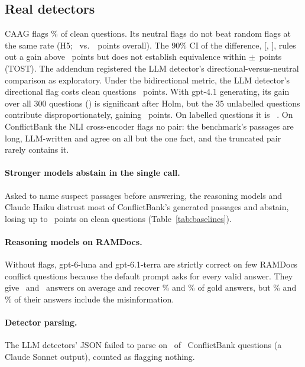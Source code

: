 \subsection{Real detectors}
CAAG flags \cleanFprCaag\% of clean questions. Its neutral flags do not beat random flags at the same rate (H5;
\dCaagFlagAll\ vs.\ \dRandFlagAll\ points overall). The 90\% CI of the difference, [\tostLo, \tostHi], rules out a
gain above \tostHi\ points but does not establish equivalence within $\pm$\tostMargin\ points (TOST). The
addendum registered the LLM detector's directional-versus-neutral comparison as exploratory.
Under the bidirectional metric, the LLM detector's directional flag costs clean questions \arLlmDirClean\ points. With
gpt-4.1 generating, its gain over all 300 questions (\gptLlmDirAll) is significant after Holm, but the 35
unlabelled questions contribute disproportionately, gaining \agptexclLlmDir\ points. On labelled
questions it is \gptlabLlmDir\ \gptlabLlmDirCI. On ConflictBank the NLI cross-encoder flags no pair:
the benchmark's passages are long, LLM-written and agree on all but the one fact, and the truncated pair rarely
contains it.

\paragraph{Stronger models abstain in the single call.} Asked to name suspect passages before answering, the reasoning
models and Claude Haiku distrust most of ConflictBank's generated passages and abstain, losing up to
\azSgTerraSelfIdentifyClean\ points on clean questions (Table~\ref{tab:baselines}).

\paragraph{Reasoning models on RAMDocs.} Without flags, gpt-6-luna and gpt-6.1-terra are
strictly correct on few RAMDocs conflict questions because the default prompt asks for every valid answer. They give
\mixRdLunaNAnswers\ and \mixRdTerraNAnswers\ answers on average and recover \mixRdLunaRecall\% and
\mixRdTerraRecall\% of gold answers, but \mixRdLunaMisinfo\% and \mixRdTerraMisinfo\% of their answers include
the misinformation.

\paragraph{Detector parsing.} The LLM detectors' JSON failed to parse on \parseFailTotal\ of \parseFailN\ ConflictBank
questions (a Claude Sonnet output), counted as flagging nothing.

